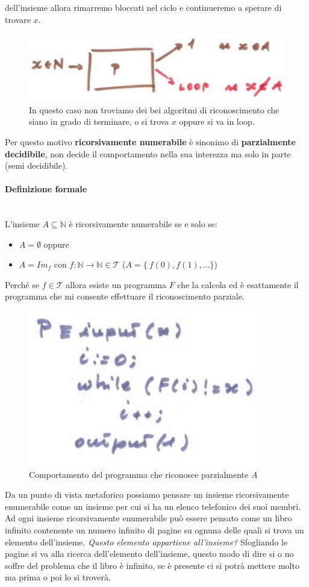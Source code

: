 \documentclass{article}
\begin{document}
dell'insieme allora rimarremo bloccati nel ciclo e continueremo a sperare di trovare $x$.
\begin{figure}[H]
    \centering
    \includegraphics[scale=0.6]{images/x_loop.png}
    \caption{In questo caso non troviamo dei bei algoritmi di riconoscimento che siano in grado di terminare,
        o si trova $x$ oppure si va in loop.}
\end{figure}
Per questo motivo \textbf{ricorsivamente numerabile} è sinonimo di \textbf{parzialmente
    decidibile}, non decide il comportamento nella sua interezza ma solo in parte (semi decidibile).

\paragraph{Definizione formale}\mbox{}\\
L'insieme $A\subseteq\mathbb{N}$ è ricorsivamente numerabile se e solo se:
\begin{itemize}
    \item $A=\emptyset$ oppure
    \item $A=Im_f$ con $f:\mathbb{N}\rightarrow\mathbb{N}\in\mathcal{T}$ ($A=\{\ f(0),f(1),\dots \}$)
\end{itemize}
Perché se $f\in\mathcal{T}$ allora esiste un programma $F$ che la calcola ed è esattamente
il programma che mi consente effettuare il riconoscimento parziale.
\begin{figure}[H]
    \centering
    \includegraphics[scale=0.5]{images/prog_ricors_rico.png}
    \caption{Comportamento del programma che riconosce parzialmente $A$}
\end{figure}
Da un punto di vista metaforico possiamo pensare un insieme ricorsivamente enumerabile come
un insieme per cui si ha un elenco telefonico dei suoi membri. Ad ogni insieme ricorsivamente
enumerabile può essere pensato come un libro infinito contenente un numero infinito di pagine
su ognuna delle quali si trova un elemento dell'insieme. \textit{Questo elemento appartiene
    all'insieme?} Sfogliando le pagine si va alla ricerca dell'elemento dell'insieme, questo
modo di dire si o no soffre del problema che il libro è infinito, se è presente ci si
potrà mettere molto ma prima o poi lo si troverà.
\end{document}
